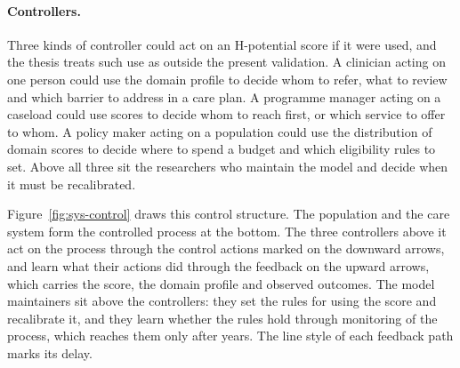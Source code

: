 \paragraph{Controllers.} Three kinds of controller could act on an
H-potential score if it were used, and the thesis treats such use as outside
the present validation. A clinician acting on one person could use the domain
profile to decide whom to refer, what to review and which barrier to address
in a care plan. A programme manager acting on a caseload could use scores to
decide whom to reach first, or which service to offer to whom. A policy maker
acting on a population could use the distribution of domain scores to decide
where to spend a budget and which eligibility rules to set. Above all three
sit the researchers who maintain the model and decide when it must be
recalibrated.

Figure~\ref{fig:sys-control} draws this control structure. The population
and the care system form the controlled process at the bottom. The three
controllers above it act on the process through the control actions marked on
the downward arrows, and learn what their actions did through the feedback on
the upward arrows, which carries the score, the domain profile and observed
outcomes. The model maintainers sit above the controllers: they set the rules
for using the score and recalibrate it, and they learn whether the rules hold
through monitoring of the process, which reaches them only after years. The
line style of each feedback path marks its delay.

